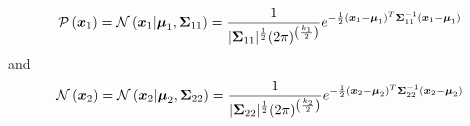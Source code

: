 \documentclass[../../main.tex]{subfiles}
\begin{document}
\begin{equation}
    \mathcal{P}\left(\boldsymbol{x}_1\right) = 
    \mathcal{N}\left(\boldsymbol{x}_1| \boldsymbol{\mu}_1, \boldsymbol{\Sigma}_{11} \right) = 
        \frac{1}{
            |\boldsymbol{\Sigma}_{11}|^\frac{1}{2} (2\pi)^{\left(\frac{k_1}{2}\right)}
        }
        e^{
                    -\frac{1}{2}
                    (\boldsymbol{x}_1 - \boldsymbol{\mu}_1)^T
                    \boldsymbol{\Sigma}_{11}^{-1}
                    (\boldsymbol{x}_1 - \boldsymbol{\mu}_1)
        }
\end{equation}
and
\begin{equation}
    \mathcal{N}\left(\boldsymbol{x}_2\right) = 
    \mathcal{N}\left(\boldsymbol{x}_2| \boldsymbol{\mu}_2, \boldsymbol{\Sigma}_{22} \right) = 
        \frac{1}{
            |\boldsymbol{\Sigma}_{22}|^\frac{1}{2} (2\pi)^{\left(\frac{k_2}{2}\right)}
        }
        e^{
                    -\frac{1}{2}
                    (\boldsymbol{x}_2 - \boldsymbol{\mu}_2)^T
                    \boldsymbol{\Sigma}_{22}^{-1}
                    (\boldsymbol{x}_2 - \boldsymbol{\mu}_2)
        }
\end{equation}
\end{document}
